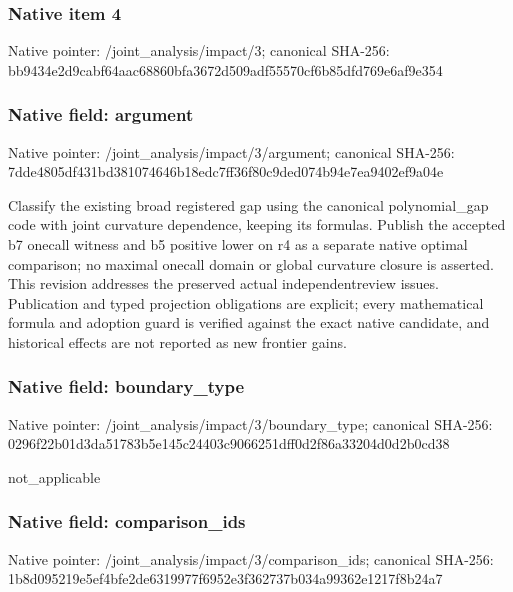 \documentclass[10pt,a4paper]{article}
\begin{document}
\subsubsection{Native item 4}


Native pointer: /joint\_analysis/impact/3; canonical SHA-256: bb9434e2d9cabf64aac68860\allowbreak{}bfa3672d509adf55570cf6b8\allowbreak{}5dfd769e6af9e354



\subsubsection{Native field: argument}


Native pointer: /joint\_analysis/impact/3/argument; canonical SHA-256: 7dde4805df431bd381074646\allowbreak{}b18edc7ff36f80c9ded074b9\allowbreak{}4e7ea9402ef9a04e


Classify the existing broad registered gap using the canonical polynomial\_gap code with joint curvature dependence, keeping its formulas. Publish the accepted b7 onecall witness and b5 positive lower on r4 as a separate native optimal comparison; no maximal onecall domain or global curvature closure is asserted. This revision addresses the preserved actual independentreview issues. Publication and typed projection obligations are explicit; every mathematical formula and adoption guard is verified against the exact native candidate, and historical effects are not reported as new frontier gains.


\subsubsection{Native field: boundary\_type}


Native pointer: /joint\_analysis/impact/3/boundary\_type; canonical SHA-256: 0296f22b01d3da51783b5e14\allowbreak{}5c24403c9066251dff0d2f86\allowbreak{}a33204d0d2b0cd38


not\_applicable


\subsubsection{Native field: comparison\_ids}


Native pointer: /joint\_analysis/impact/3/comparison\_ids; canonical SHA-256: 1b8d095219e5ef4bfe2de631\allowbreak{}9977f6952e3f362737b034a9\allowbreak{}9362e1217f8b24a7
\end{document}
